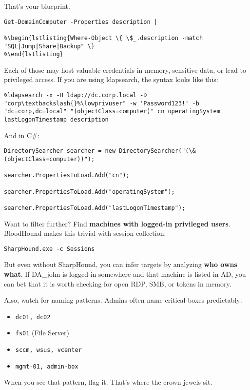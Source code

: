 That’s your blueprint.
\begin{verbatim}
Get-DomainComputer -Properties description |

%\begin{lstlisting{Where-Object \{ \$_.description -match "SQL|Jump|Share|Backup" \}
%\end{lstlisting}
\end{verbatim}
Each of those may host valuable credentials in memory, sensitive data, or lead to privileged access.
If you are using ldapsearch, the syntax looks like this:
\begin{verbatim}
%ldapsearch -x -H ldap://dc.corp.local -D "corp\textbackslash{}%\lowprivuser" -w 'Password123!' -b "dc=corp,dc=local" "(objectClass=computer)" cn operatingSystem lastLogonTimestamp description
\end{verbatim}
And in C#:
\begin{verbatim}
DirectorySearcher searcher = new DirectorySearcher("(\&(objectClass=computer))");

searcher.PropertiesToLoad.Add("cn");

searcher.PropertiesToLoad.Add("operatingSystem");

searcher.PropertiesToLoad.Add("lastLogonTimestamp");
\end{verbatim}
Want to filter further? Find \textbf{ machines with logged-in privileged users}. BloodHound makes this trivial with session collection:
\begin{verbatim}
SharpHound.exe -c Sessions
\end{verbatim}
But even without SharpHound, you can infer targets by analyzing \textbf{who owns what}. If DA\_john is logged in somewhere and that machine is listed in AD, you can bet that it is worth checking for open RDP, SMB, or tokens in memory.

Also, watch for naming patterns. Admins often name critical boxes predictably:

\begin{itemize}
    \item \texttt{dc01, dc02}
    \item \texttt{fs01} (File Server)
    \item \texttt{sccm, wsus, vcenter}
    \item \texttt{mgmt-01, admin-box}


\end{itemize}

When you see that pattern, flag it. That’s where the crown jewels sit.

